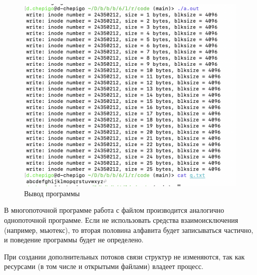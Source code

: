 \begin{figure}[!h]
	\centering
	\includegraphics[width=\textwidth]{image/3-2}
	\caption{Вывод программы}
\end{figure}

В многопоточной программе работа с файлом производится аналогично однопоточной программе. Если не использовать средства взаимоисключения (например, мьютекс), то вторая половина алфавита будет записываться частично, и поведение программы будет не определено.

При создании дополнительных потоков связи структур не изменяются, так как ресурсами (в том числе и открытыми файлами) владеет процесс.

